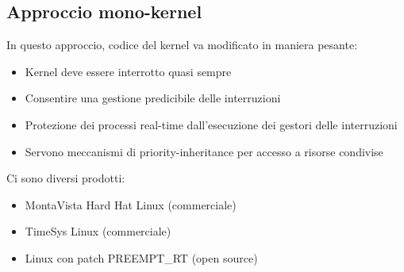 \documentclass{article}
\begin{document}
\subsection{Approccio mono-kernel}
In questo approccio, codice del kernel va modificato in maniera pesante:
\begin{itemize}
\item Kernel deve essere interrotto quasi sempre
\item Consentire una gestione predicibile delle interruzioni
\item Protezione dei processi real-time dall'esecuzione dei gestori delle interruzioni
\item Servono meccanismi di priority-inheritance per accesso a risorse condivise
\end{itemize}
Ci sono diversi prodotti:
\begin{itemize}
\item MontaVista Hard Hat Linux (commerciale)
\item TimeSys Linux (commerciale)
\item Linux con patch PREEMPT\_RT (open source)
\end{itemize}
\end{document}
